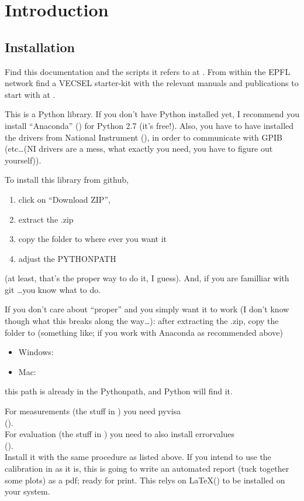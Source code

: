 \section{Introduction}

\subsection{Installation}

Find this documentation
and the scripts it refers to
at .
From within the EPFL network
find a VECSEL starter-kit
with the relevant manuals and publications
to start with
at .

This is a Python library.
If you don't have Python installed yet,
I recommend you install ``Anaconda'' ()
for Python 2.7 (it's free!).
Also,
you have to have installed
the drivers from National Instrument (),
in order to communicate with GPIB
(etc\ldots (NI drivers are a mess, what exactly you need, you have to figure out yourself)).

To install this library
from github,
\begin{enumerate}
  \item click on ``Download ZIP'',
  \item extract the .zip
  \item copy the folder to where ever you want it
  \item adjust the PYTHONPATH
\end{enumerate}
(at least, that's the proper way to do it, I guess).  
And, if you are familliar with git \ldots you know what to do.

If you don't care about ``proper''
and you simply want it to work
(I don't know though what this breaks along the way\ldots):  
after extracting the .zip,
copy the folder to (something like; if you work with Anaconda as recommended above)
\begin{itemize}
  \item Windows: 
  \item Mac: 
\end{itemize}
this path is already in the Pythonpath,
and Python will find it.

For measurements (the stuff in ) you need pyvisa \\
().\\
For evaluation (the stuff in ) you need to also install errorvalues \\
(). \\
Install it with the same procedure as listed above.
If you intend to use the calibration in  as it is,
this is going to write an automated report (tuck together some plots) as a pdf;
ready for print.
This relys on \LaTeX () to be installed on your system.

